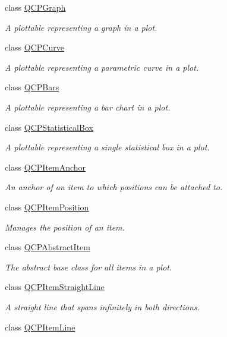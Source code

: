 \begin{DoxyCompactItemize}
class \hyperlink{a00031}{Q\+C\+P\+Graph}
\begin{DoxyCompactList}\small\item\em A plottable representing a graph in a plot. \end{DoxyCompactList}\item 
class \hyperlink{a00028}{Q\+C\+P\+Curve}
\begin{DoxyCompactList}\small\item\em A plottable representing a parametric curve in a plot. \end{DoxyCompactList}\item 
class \hyperlink{a00027}{Q\+C\+P\+Bars}
\begin{DoxyCompactList}\small\item\em A plottable representing a bar chart in a plot. \end{DoxyCompactList}\item 
class \hyperlink{a00050}{Q\+C\+P\+Statistical\+Box}
\begin{DoxyCompactList}\small\item\em A plottable representing a single statistical box in a plot. \end{DoxyCompactList}\item 
class \hyperlink{a00032}{Q\+C\+P\+Item\+Anchor}
\begin{DoxyCompactList}\small\item\em An anchor of an item to which positions can be attached to. \end{DoxyCompactList}\item 
class \hyperlink{a00038}{Q\+C\+P\+Item\+Position}
\begin{DoxyCompactList}\small\item\em Manages the position of an item. \end{DoxyCompactList}\item 
class \hyperlink{a00022}{Q\+C\+P\+Abstract\+Item}
\begin{DoxyCompactList}\small\item\em The abstract base class for all items in a plot. \end{DoxyCompactList}\item 
class \hyperlink{a00040}{Q\+C\+P\+Item\+Straight\+Line}
\begin{DoxyCompactList}\small\item\em A straight line that spans infinitely in both directions. \end{DoxyCompactList}\item 
class \hyperlink{a00036}{Q\+C\+P\+Item\+Line}

\end{DoxyCompactItemize}

